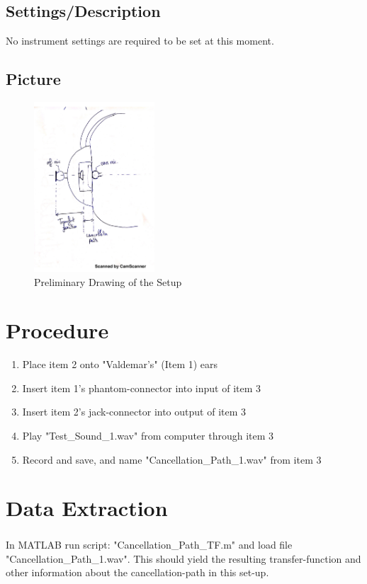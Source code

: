 \documentclass[12pt,a4paper,openright]{article}
\begin{document}
\subsection{Settings/Description}
No instrument settings are required to be set at this moment.

\subsection{Picture}
\begin{figure}[H]
	\centering
	\includegraphics[width=0.4\textwidth]{picture.png}
	\caption{Preliminary Drawing of the Setup}
	\label{PictureDrawing}
\end{figure}

\section{Procedure}
\begin{enumerate}
	\item Place item 2 onto "Valdemar's" (Item 1) ears
	\item Insert item 1's phantom-connector into input of item 3
	\item Insert item 2's jack-connector into output of item 3
	\item Play "Test\_Sound\_1.wav" from computer through item 3
	\item Record and save, and name "Cancellation\_Path\_1.wav" from item 3
\end{enumerate}

\section{Data Extraction}
In MATLAB\textsuperscript{\textregistered} run script: "Cancellation\_Path\_TF.m" and load file "Cancellation\_Path\_1.wav". This should yield the resulting transfer-function and other information about the cancellation-path in this set-up.
\end{document}
